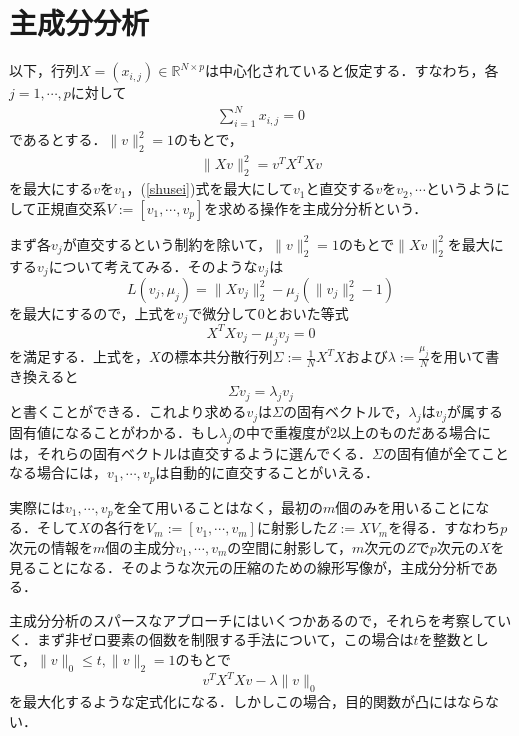 \documentclass{jsarticle}
\theoremstyle{definition}
\theoremstyle{mystyle} %
\begin{document}
\section*{主成分分析}
\vspace{5cm}
\large 以下，行列$X=(x_{i,j})\in \mathbb{R}^{N\times p}$は中心化されていると仮定する．すなわち，各$j=1,\cdots ,p$に対して
\begin{align*}
\sum_{i=1}^Nx_{i,j}=0
\end{align*}
であるとする．$\|v\|_2^2=1$のもとで，
\begin{align}
\label{shusei}
\|Xv\|_2^2=v^TX^TXv
\end{align}
を最大にする$v$を$v_1$，(\ref{shusei})式を最大にして$v_1$と直交する$v$を$v_2,\cdots$というようにして正規直交系$V:=[v_1,\cdots,v_p]$を求める操作を主成分分析という．\\
\vspace{7cm}

まず各$v_j$が直交するという制約を除いて，$\|v\|_2^2=1$のもとで$\|Xv\|_2^2$を最大にする$v_j$について考えてみる．そのような$v_j$は
$$L(v_j,\mu_j)=\|Xv_j\|_2^2-\mu_j(\|v_j\|_2^2-1)$$
を最大にするので，上式を$v_j$で微分して$0$とおいた等式
$$X^TXv_j-\mu_j v_j=0$$
を満足する．上式を，$X$の標本共分散行列$\Sigma :=\frac{1}{N}X^TX$および$\lambda:=\frac{\mu_j}{N}$を用いて書き換えると
$$\Sigma v_j = \lambda_j v_j$$
と書くことができる．これより求める$v_j$は$\Sigma$の固有ベクトルで，$\lambda_j$は$v_j$が属する固有値になることがわかる．もし$\lambda_j$の中で重複度が2以上のものだある場合には，それらの固有ベクトルは直交するように選んでくる．$\Sigma$の固有値が全てことなる場合には，$v_1,\cdots,v_p$は自動的に直交することがいえる．\\
\vspace*{5cm}

実際には$v_1,\cdots,v_p$を全て用いることはなく，最初の$m$個のみを用いることになる．そして$X$の各行を$V_m:=[v_1,\cdots,v_m]$に射影した$Z:=XV_m$を得る．すなわち$p$次元の情報を$m$個の主成分$v_1,\cdots,v_m$の空間に射影して，$m$次元の$Z$で$p$次元の$X$を見ることになる．そのような次元の圧縮のための線形写像が，主成分分析である．\\
\vspace*{3cm}

主成分分析のスパースなアプローチにはいくつかあるので，それらを考察していく．まず非ゼロ要素の個数を制限する手法について，この場合は$t$を整数として，$\|v\|_0\leq t,\| v\|_2=1$のもとで
$$v^TX^TXv-\lambda \|v\|_0$$
を最大化するような定式化になる．しかしこの場合，目的関数が凸にはならない．\\
\end{document}
